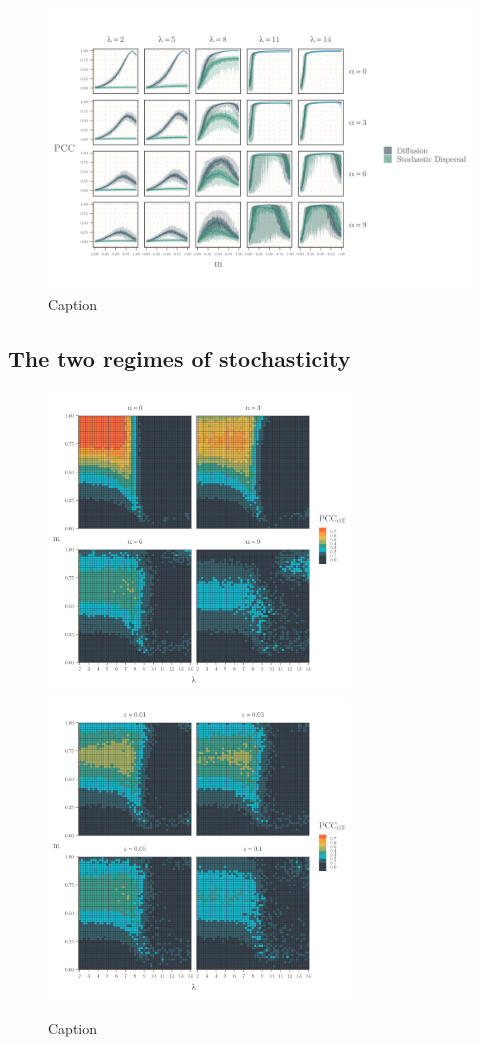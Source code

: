 \documentclass[]{article}
\begin{document}
\begin{figure}[H]
    \centering
    \includegraphics[width=15cm]{figs/lambda_and_alpha.png}
    \caption{Caption}
    \label{fig:mig_grad}
\end{figure}


\subsection{The two regimes of stochasticity}


\begin{figure}[H]
    \centering
    \includegraphics[width=8cm]{figs/vary_alpha.png}
        \includegraphics[width=8cm]{figs/vary_epsilon.png}    
    \caption{Caption}
    \label{fig:mig_grad}
\end{figure}
\end{document}
